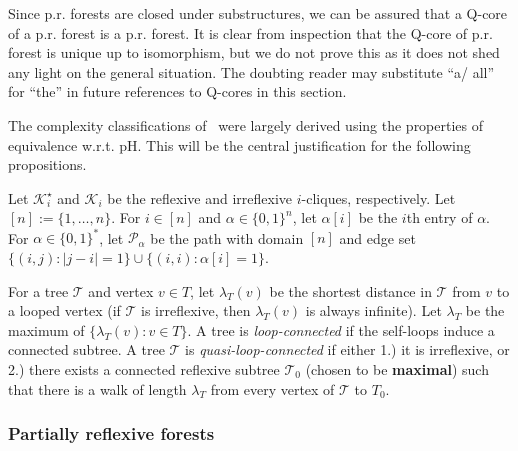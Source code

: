 \documentclass{LMCS}
\begin{document}
Since \mbox{p.r.} forests  are closed under substructures, we can be assured that a Q-core of a
\mbox{p.r.} forest 
is a \mbox{p.r.} forest. It is clear from
inspection that the Q-core of \mbox{p.r.} forest 
is unique up to isomorphism, but we do not prove this as it does not
shed any light on the general situation. The doubting reader may
substitute ``a/ all'' for ``the'' in future references to Q-cores in
this section.

The complexity classifications of~\cite{QCSPforests} were largely
derived using the properties of equivalence \mbox{w.r.t.} pH.
This will be the central justification for the following propositions.

Let $\mathcal{K}^\star_i$ and $\mathcal{K}_i$ be the reflexive and irreflexive
$i$-cliques, respectively. Let $[n]:=\{1,\ldots,n\}$. For $i \in [n]$
and $\alpha \in \{0,1\}^n$, let $\alpha[i]$ be the $i$th entry of
$\alpha$. For $\alpha \in \{0,1\}^*$, 
let $\mathcal{P}_{\alpha}$ be
the path with domain $[n]$ and edge set $\{ (i,j) : |j-i|=1 \} \cup \{
(i,i) : \alpha[i]=1 \}$. 


For a tree $\mathcal{T}$ and vertex $v \in T$, let $\lambda_T(v)$ be the shortest distance in $\mathcal{T}$ from $v$ to a looped vertex (if $\mathcal{T}$ is irreflexive, then $\lambda_T(v)$ is always infinite). Let $\lambda_T$ be the maximum of $\{\lambda_T(v):v \in T\}$. A tree is \emph{loop-connected} if the self-loops induce a connected subtree. A tree $\mathcal{T}$ is \emph{quasi-loop-connected} if either 1.) it is irreflexive, or 2.) there exists a connected reflexive subtree $\mathcal{T}_0$ (chosen to be \textbf{maximal}) such that there is a walk of length $\lambda_T$ from every vertex of $\mathcal{T}$ to $T_0$. 

\subsubsection{Partially reflexive forests}
\end{document}
